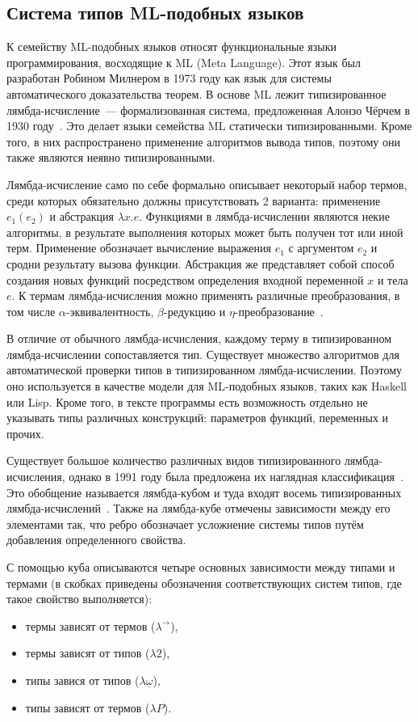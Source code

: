 \subsection{Система типов ML-подобных языков}
\label{subsec:ml_type_system}

К семейству ML-подобных языков относят функциональные языки программирования, восходящие к ML (Meta Language).
Этот язык был разработан Робином Милнером в 1973 году как язык для системы автоматического доказательства теорем.
В основе ML лежит типизированное лямбда-исчисление~--- формализованная система, предложенная Алонзо Чёрчем в 1930 году~\cite{sep-church}.
Это делает языки семейства ML статически типизированными.
Кроме того, в них распространено применение алгоритмов вывода типов, поэтому они также являются неявно типизированными.

Лямбда-исчисление само по себе формально описывает некоторый набор термов, среди которых обязательно должны присутствовать 2 варианта: применение $e_1(e_2)$ и абстракция $\lambda x. e$.
Функциями в лямбда-исчислении являются некие алгоритмы, в результате выполнения которых может быть получен тот или иной терм.
Применение обозначает вычисление выражения $e_1$ с аргументом $e_2$ и сродни результату вызова функции.
Абстракция же представляет собой способ создания новых функций посредством определения входной переменной $x$ и тела $e$.
К термам лямбда-исчисления можно применять различные преобразования, в том числе $\alpha$-эквивалентность, $\beta$-редукцию и $\eta$-преобразование~\cite{LambdaCalculus}.

В отличие от обычного лямбда-исчисления, каждому терму в типизированном лямбда-исчислении сопоставляется тип.
Существует множество алгоритмов для автоматической проверки типов в типизированном лямбда-исчислении.
Поэтому оно используется в качестве модели для ML-подобных языков, таких как Haskell или Lisp.
Кроме того, в тексте программы есть возможность отдельно не указывать типы различных конструкций: параметров функций, переменных и прочих.

Существует большое количество различных видов типизированного лямбда-исчисления, однако в 1991 году была предложена их наглядная классификация~\cite{LambdaCalculusWithTypes}.
Это обобщение называется лямбда-кубом и туда входят восемь типизированных лямбда-исчислений~.
Также на лямбда-кубе отмечены зависимости между его элементами так, что ребро обозначает усложнение системы типов путём добавления определенного свойства.

С помощью куба описываются четыре основных зависимости между типами и термами (в скобках приведены обозначения соответствующих систем типов, где такое свойство выполняется):
\begin{itemize}
    \item термы зависят от термов ($\lambda^{\to}$),
    \item термы зависят от типов ($\lambda 2$),
    \item типы завися от типов ($\lambda \underline{\omega}$),
    \item типы зависят от термов ($\lambda P$).
\end{itemize}

